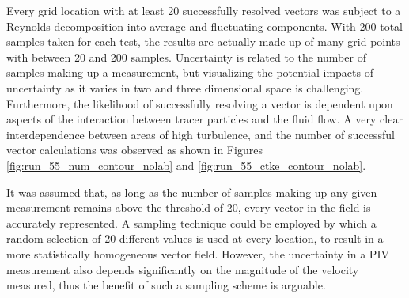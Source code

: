 Every grid location with at least 20 successfully resolved vectors was 
subject to a Reynolds decomposition into average and fluctuating components. 
With 200 total samples taken for each test, the results are actually made up of 
many grid points with between 20 and 200 samples. Uncertainty is related to the 
number of samples making up a measurement, but visualizing the potential 
impacts of uncertainty as it varies in two and three dimensional space is 
challenging. Furthermore, the likelihood of successfully resolving a vector is 
dependent upon aspects of the interaction between tracer particles and the 
fluid flow. A very clear interdependence between areas of high turbulence, and 
the number of successful vector calculations was observed as shown in Figures 
\ref{fig:run_55_num_contour_nolab} and \ref{fig:run_55_ctke_contour_nolab}. 




It was assumed that, as long as the number of samples making up any given 
measurement remains above the threshold of 20, every vector in the field is 
accurately represented. A sampling technique could be employed by 
which a random selection of 20 different values is used at every location, to 
result in a more statistically homogeneous vector field. However, 
the uncertainty in a PIV measurement also depends significantly on the 
magnitude of the velocity measured, thus the benefit of such a sampling scheme 
is arguable.